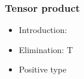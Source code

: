 \documentclass{beamer}
\begin{document}
  \begin{frame}
    \frametitle{Tensor product}
    \begin{itemize}
    \item Introduction:
                {\ctx{\Gamma}{\Delta} \vdash {} \ni {}}
      \bigskip
    \item Elimination:
                {\ctx{\Gamma}{\Delta} \vdash {} \in T}
      \bigskip
    \item Positive type
    \end{itemize}
  \end{frame}
\end{document}
